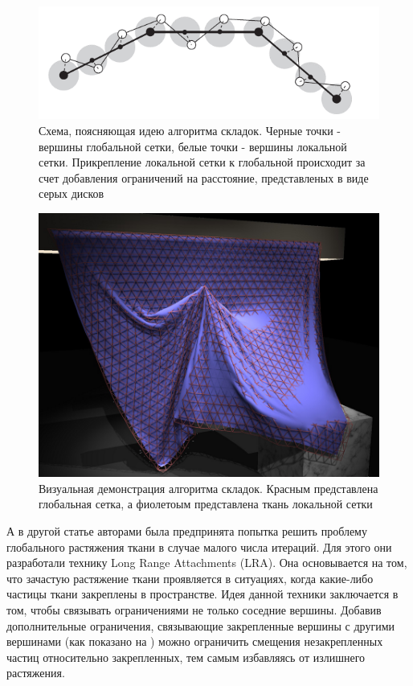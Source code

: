	\begin{figure}[ht!] 
		\center
		\includegraphics [scale=0.7] {my_folder/images//wrincle_mesh_idea}
		\caption{Схема, поясняющая идею алгоритма складок. Черные точки - вершины глобальной сетки, белые точки - вершины локальной сетки. Прикрепление локальной сетки к глобальной происходит за счет добавления ограничений на расстояние, представленых в виде серых дисков}
		\label{fig:wrincle-idea}  
	\end{figure}
	
		
	\begin{figure}[ht!] 
		\center
		\includegraphics [scale=0.5] {my_folder/images//wrincle_mesh_show}
		\caption{Визуальная демонстрация алгоритма складок. Красным представлена глобальная сетка, а фиолетоым представлена ткань локальной сетки}
		\label{fig:wrincle-show}  
	\end{figure}
	
	А в другой статье \cite{kim2012long} авторами была предпринята попытка решить проблему глобального растяжения ткани в случае малого числа итераций. Для этого они разработали технику Long Range Attachments (LRA). Она основывается на том, что зачастую растяжение ткани проявляется в ситуациях, когда какие-либо частицы ткани закреплены в пространстве. Идея данной техники заключается в том, чтобы связывать ограничениями не только соседние вершины. Добавив дополнительные ограничения, связывающие закрепленные вершины с другими вершинами (как показано на ) можно ограничить смещения незакрепленных частиц относительно закрепленных, тем самым избавляясь от излишнего растяжения.
	
